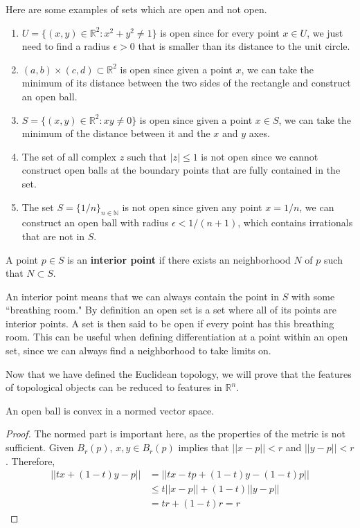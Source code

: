 \documentclass{article}
\begin{document}
      \begin{example}
        Here are some examples of sets which are open and not open. 
        \begin{enumerate}
          \item $U=\{(x,y)\in \mathbb{R}^2 : x^2+y^2 \neq 1\}$ is open since for every point $x \in U$, we just need to find a radius $\epsilon >0$ that is smaller than its distance to the unit circle. 
          \item $(a, b) \times (c, d) \subset \mathbb{R}^2$ is open since given a point $x$, we can take the minimum of its distance between the two sides of the rectangle and construct an open ball. 
          \item $S=\{(x,y)\in \mathbb{R}^2:xy\neq 0\}$ is open since given a point $x \in S$, we can take the minimum of the distance between it and the $x$ and $y$ axes. 
          \item The set of all complex $z$ such that $|z| \leq 1$ is not open since we cannot construct open balls at the boundary points that are fully contained in the set. 
          \item The set $S = \{1/n\}_{n \in \mathbb{N}}$ is not open since given any point $x = 1/n$, we can construct an open ball with radius $\epsilon < 1/(n+1)$, which contains irrationals that are not in $S$. 
        \end{enumerate}
      \end{example}

      \begin{definition}
        A point $p \in S$ is an \textbf{interior point} if there exists an neighborhood $N$ of $p$ such that $N \subset S$. 
      \end{definition}

      An interior point means that we can always contain the point in $S$ with some ``breathing room." By definition an open set is a set where all of its points are interior points. A set is then said to be open if every point has this breathing room. This can be useful when defining differentiation at a point within an open set, since we can always find a neighborhood to take limits on. 

      Now that we have defined the Euclidean topology, we will prove that the features of topological objects can be reduced to features in $\mathbb{R}^n$. 

      \begin{theorem}[Convexity]
        An open ball is convex in a normed vector space. 
      \end{theorem}
      \begin{proof}
        The normed part is important here, as the properties of the metric is not sufficient. Given $B_r (p)$, $x, y \in B_r (p)$ implies that $||x - p|| < r$ and $||y - p ||<r$. Therefore, 
        \begin{align}
          ||t x + (1 - t)y - p|| & = ||t x - tp + (1 - t) y - (1 - t) p|| \\
          & \leq t ||x - p|| + (1 - t) ||y - p|| \\
          & = t r + (1 - t) r = r 
        \end{align}
      \end{proof}
\end{document}
